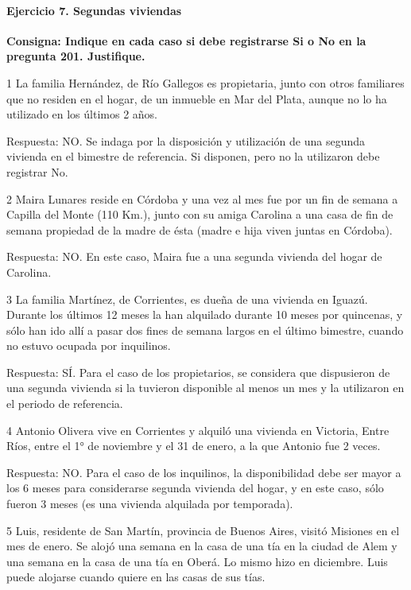 \documentclass[
  openany]{book}
\begin{document}
\hypertarget{ejercicio-7.-segundas-viviendas-1}{%
\paragraph{Ejercicio 7. Segundas viviendas}\label{ejercicio-7.-segundas-viviendas-1}}

\textbf{Consigna: Indique en cada caso si debe registrarse Si o No en la pregunta 201. Justifique.}

1 La familia Hernández, de Río Gallegos es propietaria, junto con otros familiares que no residen en el hogar, de un inmueble en Mar del Plata, aunque no lo ha utilizado en los últimos 2 años.

Respuesta: NO. Se indaga por la disposición y utilización de una segunda vivienda en el bimestre de referencia. Si disponen, pero no la utilizaron debe registrar No.

2 Maira Lunares reside en Córdoba y una vez al mes fue por un fin de semana a Capilla del Monte (110 Km.), junto con su amiga Carolina a una casa de fin de semana propiedad de la madre de ésta (madre e hija viven juntas en Córdoba).

Respuesta: NO. En este caso, Maira fue a una segunda vivienda del hogar de Carolina.

3 La familia Martínez, de Corrientes, es dueña de una vivienda en Iguazú. Durante los últimos 12 meses la han alquilado durante 10 meses por quincenas, y sólo han ido allí a pasar dos fines de semana largos en el último bimestre, cuando no estuvo ocupada por inquilinos.

Respuesta: SÍ. Para el caso de los propietarios, se considera que dispusieron de una segunda vivienda si la tuvieron disponible al menos un mes y la utilizaron en el periodo de referencia.

4 Antonio Olivera vive en Corrientes y alquiló una vivienda en Victoria, Entre Ríos, entre el 1° de noviembre y el 31 de enero, a la que Antonio fue 2 veces.

Respuesta: NO. Para el caso de los inquilinos, la disponibilidad debe ser mayor a los 6 meses para considerarse segunda vivienda del hogar, y en este caso, sólo fueron 3 meses (es una vivienda alquilada por temporada).

5 Luis, residente de San Martín, provincia de Buenos Aires, visitó Misiones en el mes de enero. Se alojó una semana en la casa de una tía en la ciudad de Alem y una semana en la casa de una tía en Oberá. Lo mismo hizo en diciembre. Luis puede alojarse cuando quiere en las casas de sus tías.
\end{document}
